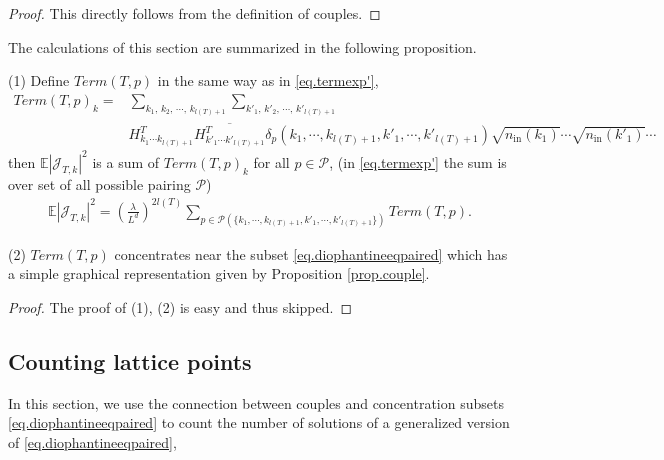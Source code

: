 \begin{proof}
This directly follows from the definition of couples. 
\end{proof}


The calculations of this section are summarized in the following proposition.  

\begin{prop}\label{prop.termcouple} (1) Define $Term(T,p)$ in the same way as in \eqref{eq.termexp'},
\begin{equation}\label{eq.termTp}
\begin{split}
    Term(T, p)_k=&\sum_{k_1,\, k_2,\, \cdots,\, k_{l(T)+1}}\sum_{k'_1,\, k'_2,\, \cdots,\, k'_{l(T)+1}}
    \\
    &H^T_{k_1\cdots k_{l(T)+1}} \overline{H^{T}_{k'_1\cdots k'_{l(T)+1}}} \delta_{p}(k_1,\cdots, k_{l(T)+1}, k'_1,\cdots, k'_{l(T)+1})\sqrt{n_{\textrm{in}}(k_1)}\cdots\sqrt{n_{\textrm{in}}(k'_1)}\cdots
\end{split}
\end{equation}
then $\mathbb{E}|\mathcal{J}_{T,k}|^2$ is a sum of $Term(T,p)_k$ for all $p\in \mathcal{P}$, (in \eqref{eq.termexp'} the sum is over set of all possible pairing $\mathcal{P}$)
\begin{equation}\label{eq.termexp}
\begin{split}
    \mathbb{E}|\mathcal{J}_{T,k}|^2=\left(\frac{\lambda}{L^{d}}\right)^{2l(T)}
    \sum_{p\in \mathcal{P}(\{k_1,\cdots, k_{l(T)+1}, k'_1,\cdots, k'_{l(T)+1}\})} Term(T, p).
\end{split}
\end{equation}

(2) $Term(T,p)$ concentrates near the subset \eqref{eq.diophantineeqpaired} which has a simple graphical representation given by Proposition \ref{prop.couple}. 
\end{prop}

\begin{proof} The proof of (1), (2) is easy and thus skipped. 
\end{proof}


\subsection{Counting lattice points}\label{sec.numbertheory} In this section, we use the connection between couples and concentration subsets \eqref{eq.diophantineeqpaired} to count the number of solutions of a generalized version of \eqref{eq.diophantineeqpaired},




